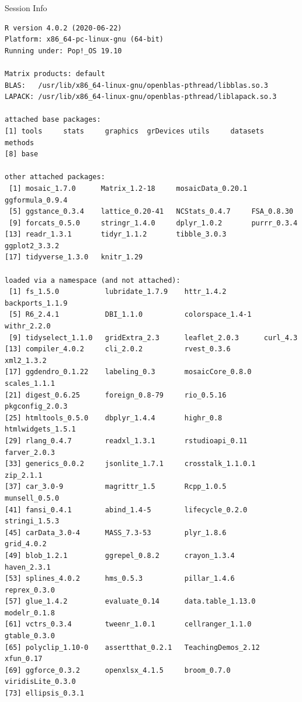 \documentclass[10pt]{beamer}\usepackage[]{graphicx}\usepackage[]{color}
\makeatletter
\newenvironment{kframe}{%
 \def\at@end@of@kframe{}%
 \ifinner\ifhmode%
  \def\at@end@of@kframe{\end{minipage}}%
  \begin{minipage}{\columnwidth}%
 \fi\fi%
 \def\FrameCommand##1{\hskip\@totalleftmargin \hskip-\fboxsep
 \colorbox{shadecolor}{##1}\hskip-\fboxsep
     \hskip-\linewidth \hskip-\@totalleftmargin \hskip\columnwidth}%
 \MakeFramed {\advance\hsize-\width
   \@totalleftmargin\z@ \linewidth\hsize
   \@setminipage}}%
 {\par\unskip\endMakeFramed%
 \at@end@of@kframe}
\newenvironment{knitrout}{}{} %
\makeatother
\begin{document}
\begin{frame}[fragile]{Session Info}
	\tiny
	
\begin{knitrout}\tiny
{}\color{fgcolor}\begin{kframe}
\begin{verbatim}
R version 4.0.2 (2020-06-22)
Platform: x86_64-pc-linux-gnu (64-bit)
Running under: Pop!_OS 19.10

Matrix products: default
BLAS:   /usr/lib/x86_64-linux-gnu/openblas-pthread/libblas.so.3
LAPACK: /usr/lib/x86_64-linux-gnu/openblas-pthread/liblapack.so.3

attached base packages:
[1] tools     stats     graphics  grDevices utils     datasets  methods  
[8] base     

other attached packages:
 [1] mosaic_1.7.0      Matrix_1.2-18     mosaicData_0.20.1 ggformula_0.9.4  
 [5] ggstance_0.3.4    lattice_0.20-41   NCStats_0.4.7     FSA_0.8.30       
 [9] forcats_0.5.0     stringr_1.4.0     dplyr_1.0.2       purrr_0.3.4      
[13] readr_1.3.1       tidyr_1.1.2       tibble_3.0.3      ggplot2_3.3.2    
[17] tidyverse_1.3.0   knitr_1.29       

loaded via a namespace (and not attached):
 [1] fs_1.5.0           lubridate_1.7.9    httr_1.4.2         backports_1.1.9   
 [5] R6_2.4.1           DBI_1.1.0          colorspace_1.4-1   withr_2.2.0       
 [9] tidyselect_1.1.0   gridExtra_2.3      leaflet_2.0.3      curl_4.3          
[13] compiler_4.0.2     cli_2.0.2          rvest_0.3.6        xml2_1.3.2        
[17] ggdendro_0.1.22    labeling_0.3       mosaicCore_0.8.0   scales_1.1.1      
[21] digest_0.6.25      foreign_0.8-79     rio_0.5.16         pkgconfig_2.0.3   
[25] htmltools_0.5.0    dbplyr_1.4.4       highr_0.8          htmlwidgets_1.5.1 
[29] rlang_0.4.7        readxl_1.3.1       rstudioapi_0.11    farver_2.0.3      
[33] generics_0.0.2     jsonlite_1.7.1     crosstalk_1.1.0.1  zip_2.1.1         
[37] car_3.0-9          magrittr_1.5       Rcpp_1.0.5         munsell_0.5.0     
[41] fansi_0.4.1        abind_1.4-5        lifecycle_0.2.0    stringi_1.5.3     
[45] carData_3.0-4      MASS_7.3-53        plyr_1.8.6         grid_4.0.2        
[49] blob_1.2.1         ggrepel_0.8.2      crayon_1.3.4       haven_2.3.1       
[53] splines_4.0.2      hms_0.5.3          pillar_1.4.6       reprex_0.3.0      
[57] glue_1.4.2         evaluate_0.14      data.table_1.13.0  modelr_0.1.8      
[61] vctrs_0.3.4        tweenr_1.0.1       cellranger_1.1.0   gtable_0.3.0      
[65] polyclip_1.10-0    assertthat_0.2.1   TeachingDemos_2.12 xfun_0.17         
[69] ggforce_0.3.2      openxlsx_4.1.5     broom_0.7.0        viridisLite_0.3.0 
[73] ellipsis_0.3.1    
\end{verbatim}
\end{kframe}
\end{knitrout}
	
\end{frame}
\end{document}
